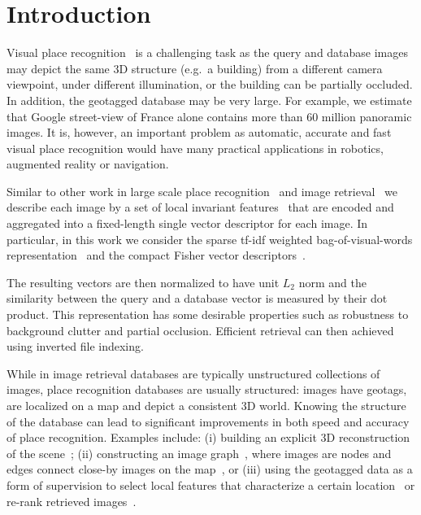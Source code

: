 \section{Introduction}
   \label{intro}
   Visual place recognition~\cite{Cummins09,Knopp2010,Schindler07} is a challenging task as the query and database images may depict the same 3D structure (e.g.\ a building) from a different camera viewpoint, under different illumination, or the building can be partially occluded. 
   In addition, the geotagged database may be very large. For example, we estimate that Google street-view of France alone contains more than 60 million panoramic images.
It is, however, an important problem as automatic, accurate and fast visual place recognition would have many practical applications in robotics, augmented reality or navigation.

  Similar to other work in large scale place recognition~\cite{Cummins09,Knopp2010,Schindler07,Torii2013} and image retrieval~\cite{Nister06,Philbin07,Sivic03,Jegou12} we describe each image by a set of local invariant features~\cite{Bay06,Lowe04} that are encoded and aggregated into a fixed-length single vector descriptor for each image. In particular, in this work we consider the sparse tf-idf weighted bag-of-visual-words representation~\cite{Sivic03,Philbin07} and the compact Fisher vector descriptors~\cite{Jegou12}.  
  
  The resulting vectors are then normalized to have unit $L_2$ norm and the similarity between the query and a database vector is measured by their dot product. This representation has some desirable properties such as robustness to background clutter and partial occlusion. Efficient retrieval can then achieved using inverted file indexing.


   While in image retrieval  databases are typically unstructured collections of images, place recognition databases are usually structured: images have geotags, are localized on a map and depict a consistent 3D world. %
   Knowing the structure of the database can lead to significant improvements in both speed and accuracy of place recognition. 
   Examples include: (i) building an explicit 3D reconstruction of the scene~\cite{Irschara2009,Li10,Li12}; (ii) constructing an image graph~\cite{Cao13,Philbin10c,Turcot09}, where images are nodes and edges connect close-by images on the map~\cite{Torii11}, or (iii) using the geotagged data as a form of supervision to select local features that characterize a certain location~\cite{Knopp2010,Schindler07} or re-rank retrieved images~\cite{Zamir10}.

